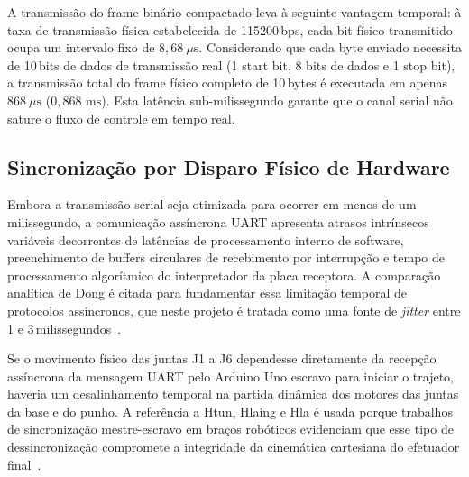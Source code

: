 A transmissão do frame binário compactado leva à seguinte vantagem temporal: à taxa de transmissão física estabelecida de 115200\,bps, cada bit físico transmitido ocupa um intervalo fixo de $8{,}68\ \mu\text{s}$. Considerando que cada byte enviado necessita de 10\,bits de dados de transmissão real (1 start bit, 8 bits de dados e 1 stop bit), a transmissão total do frame físico completo de 10\,bytes é executada em apenas $868\ \mu\text{s}$ ($0{,}868\text{ ms}$). Esta latência sub-milissegundo garante que o canal serial não sature o fluxo de controle em tempo real.

\subsection{Sincronização por Disparo Físico de Hardware}
\label{subsec:trigger_hardware}

Embora a transmissão serial seja otimizada para ocorrer em menos de um milissegundo, a comunicação assíncrona UART apresenta atrasos intrínsecos variáveis decorrentes de latências de processamento interno de software, preenchimento de buffers circulares de recebimento por interrupção e tempo de processamento algorítmico do interpretador da placa receptora. A comparação analítica de Dong é citada para fundamentar essa limitação temporal de protocolos assíncronos, que neste projeto é tratada como uma fonte de \textit{jitter} entre 1 e 3\,milissegundos~\cite{dong2022comparative}.

Se o movimento físico das juntas J1 a J6 dependesse diretamente da recepção assíncrona da mensagem UART pelo Arduino Uno escravo para iniciar o trajeto, haveria um desalinhamento temporal na partida dinâmica dos motores das juntas da base e do punho. A referência a Htun, Hlaing e Hla é usada porque trabalhos de sincronização mestre-escravo em braços robóticos evidenciam que esse tipo de dessincronização compromete a integridade da cinemática cartesiana do efetuador final~\cite{htun2023master}.

